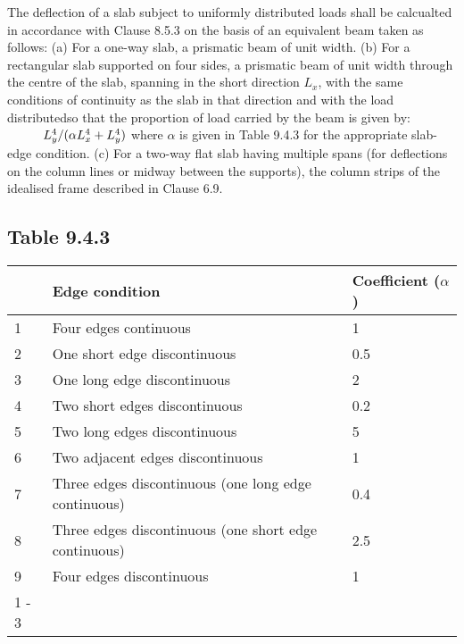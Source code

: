 \documentclass{article}%
\begin{document}
%
The deflection of a slab subject to uniformly distributed loads shall be calcualted in accordance with Clause 8.5.3 on the basis of an equivalent beam taken as follows:\newline%
\newline%
(a)	For a one{-}way slab, a prismatic beam of unit width.\newline%
\newline%
(b)	For a rectangular slab supported on four sides, a prismatic beam of unit width through the centre of the slab, spanning in the short direction %
$L_{x}$, with the same conditions of continuity as the slab in that direction and with the load distributedso that the proportion of load carried by the beam is given by:%
\newline%
\newline%
%
$\hspace*{10mm} L_{y}^{4} / (\alpha L_{x}^{4} + L_{y}^{4})$%
\newline%
\newline%
where %
 $\alpha$ is given in Table 9.4.3 for the appropriate slab-edge condition.%
\newline%
\newline%
(c)	 For a two{-}way flat slab having multiple spans (for deflections on the column lines or midway between the supports), the column strips of the idealised frame described in Clause 6.9.%
\subsection*{Table 9.4.3}%
\label{subsec:Table9.4.3}%
\begin{tabular}{l l | l }%
\hline%
&Edge condition&Coefficient ($\alpha$)\\%
\hline%
1&Four edges continuous&1\\%
2&One short edge discontinuous&0.5\\%
3&One long edge discontinuous&2\\%
4&Two short edges discontinuous&0.2\\%
5&Two long edges discontinuous&5\\%
6&Two adjacent edges discontinuous&1\\%
7&Three edges discontinuous (one long edge continuous)&0.4\\%
8&Three edges discontinuous (one short edge continuous)&2.5\\%
9&Four edges discontinuous&1\\%
\cline{1%
-%
3}%
\end{tabular}
\end{document}
